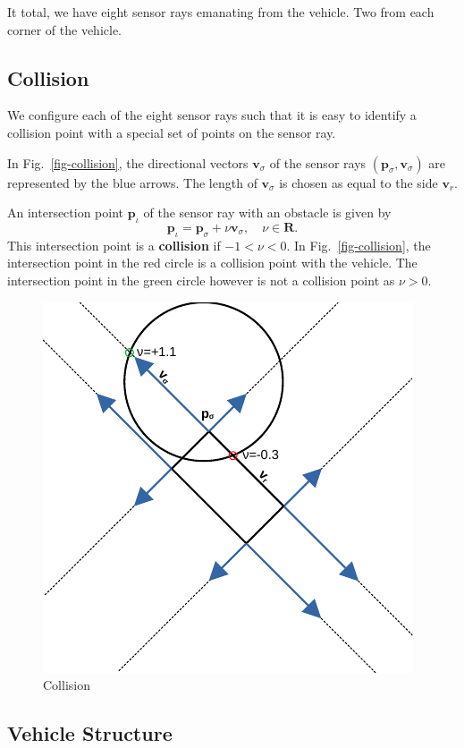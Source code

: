 \documentclass[11pt]{article}
\newcommand{\pbiot}{\mathbf{p}_\iota}
\newcommand{\pbsig}{\mathbf{p}_\sigma}
\newcommand{\Rb}{\mathbf{R}}
\newcommand{\vbr}{\mathbf{v}_r}
\newcommand{\vbsig}{\mathbf{v}_\sigma}
\newcommand{\figref}[1]{Fig.~\eqref{#1}}
\begin{document}
It total, we have eight sensor rays emanating  from the vehicle. Two from each
corner of the vehicle.

\subsection{Collision}
\label{sec-game-collision}
We configure each of the eight sensor rays such that it is easy to identify a
collision point with a special set of points on the sensor ray.

In \figref{fig-collision}, the directional vectors $\vbsig$ of the sensor
rays $(\pbsig, \vbsig)$ are represented by the blue arrows. The length of
$\vbsig$ is chosen as equal to the side $\vbr$. 

An intersection point $\pbiot$ of the sensor ray with an obstacle is given by
\begin{equation}
    \pbiot = \pbsig + \nu\vbsig,\quad \nu \in \Rb.
\end{equation}
This intersection point is a \textbf{collision} if $-1<\nu<0$. In
\figref{fig-collision}, the intersection point in the red circle is a collision
point with the vehicle. The intersection point in the green circle however is
not a collision point as $\nu>0$.

\begin{figure}
    \centering
    \includegraphics{odg/collision.pdf}
    \caption{Collision}\label{fig-collision}
\end{figure}
\subsection{Vehicle Structure}
\label{sec-game-vehicle-structure}
\end{document}
